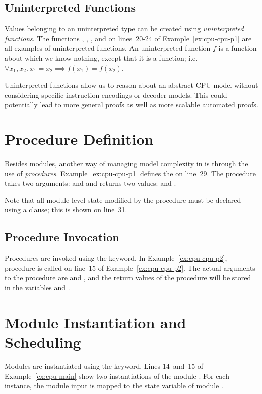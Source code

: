 \subsection{Uninterpreted Functions}
Values belonging to an uninterpreted type can be created using \emph{uninterpreted functions}. The functions , , ,  and  on lines~20-24 of Example~\ref{ex:cpu-cpu-p1} are all examples of uninterpreted functions. An uninterpreted function $f$ is a function about which we know nothing, except that it is a function; i.e. $\forall x_1, x_2.~ x_1 = x_2 \implies f(x_1) = f(x_2)$.

Uninterpreted functions allow us to reason about an abstract CPU model without considering specific instruction encodings or decoder models. This could potentially lead to more general proofs as well as more scalable automated proofs. 


\section{Procedure Definition}
Besides modules, another way of managing model complexity in \uclid{} is through the use of \emph{procedures}. Example~\ref{ex:cpu-cpu-p1} defines the   on line~29. The procedure takes two arguments:  and  and returns two values:  and .

Note that all module-level state modified by the procedure must be declared using a  clause; this is shown on line~31.

\subsection{Procedure Invocation}
Procedures are invoked using the  keyword. In Example~\ref{ex:cpu-cpu-p2}, procedure  is called on line~15 of Example~\ref{ex:cpu-cpu-p2}. The actual arguments to the procedure are  and , and the return values of the procedure will be stored in the variables  and .

\section{Module Instantiation and Scheduling}

Modules are instantiated using the  keyword. Lines 14~and~15 of Example~\ref{ex:cpu-main} show two instantiations of the module . For each instance, the module input  is mapped to the state variable  of module .

